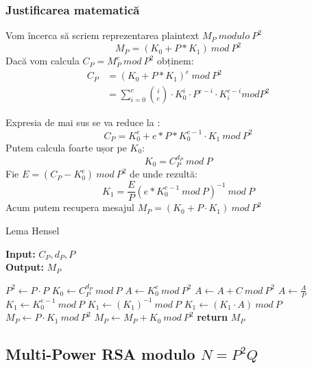 \documentclass[12pt, oneside]{book}
\begin{document}
		  \subsubsection{Justificarea matematică}
		  Vom încerca să scriem reprezentarea plaintext $M_P \ modulo \ P^2$
		  $$ M_P=(K_0 + P*K_1) \ mod \ P^2$$
		  Dacă vom calcula $C_P = M_{P}^{e} \ mod \ P^2$ obținem:
		  \begin{align*}
		   C_P &= (K_0 + P*K_1)^e \ mod \ P^2 \\
		   &= \sum_{i=0}^{e} \binom ie \cdot   K_{0}^{i} \cdot   P^{e-i} \cdot   K_{i}^{e-i} mod P^2 
		  \end{align*}
		  
		  Expresia de mai sus se va reduce la :
		  $$ C_P = K_{0}^{e}  + e*P*K_{0}^{e-1} \cdot   K_1 \ mod \ P^2 $$
		  Putem calcula foarte ușor pe $K_0$:
		  $$K_0=C_{P}^{d_P} \ mod \ P$$
		  Fie $E = (C_P - K_{0}^{e}) \ mod \ P^2$ de unde rezultă:
		  $$ K_1=\frac{E}{P} (e*K_{0}^{e-1} \ mod \ P)^{-1} \ mod \ P $$
		  Acum putem recupera mesajul $M_P = (K_0 + P \cdot   K_1) \ mod \ P^2$
		  
		  
\begin{algorithm}[H]
		   \caption{Lema Hensel }
		   \textbf{Input:} $C_P,d_P,P$ \\
		   \textbf{Output:} $ M_P $
		   \begin{algorithmic}
		   	\State $ P^2 \gets P \cdot P$
		   	\State $ K_0 \gets C^{d_P}_{P} \ mod \ P$
		   	\State $A \gets K_{0}^{e} \ mod \ P^2 $
		   	\State $A \gets A + C \ mod \ P^2$
		   	\State $A \gets \frac{A}{P} $
		   	\State $K_1 \gets K_{0}^{e-1} \ mod \ P$
		   	\State $K_1 \gets (K_1)^{-1} \ mod \ P$
		   	\State $ K_1 \gets (K_1 \cdot A) \ mod \ P$
		   	\State $M_P \gets P \cdot K_1 \ mod \ P^2$
		   	\State $M_P \gets M_P + K_0 \ mod \ P^2$
		   	\State \textbf{return} $M_P$
		   \end{algorithmic}
		   \end{algorithm} 		  
		  
		  
		  \subsection{Multi-Power RSA modulo $N=P^2Q$}
\end{document}
